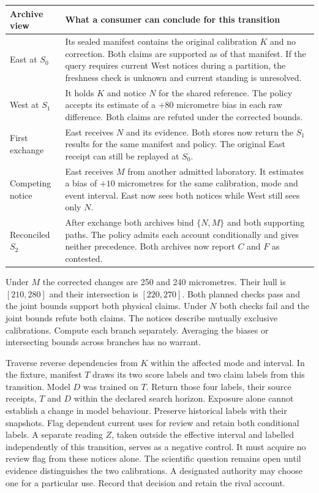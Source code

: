 \documentclass[11pt,a4paper]{article}
\begin{document}
\small
\begin{tabularx}{\linewidth}{@{}L{.22\linewidth}Y@{}}
\toprule
\textbf{Archive view} & \textbf{What a consumer can conclude for this transition} \\ \midrule
East at $S_0$ & Its sealed manifest contains the original calibration $K$ and no correction. Both claims are supported as of that manifest. If the query requires current West notices during a partition, the freshness check is unknown and current standing is unresolved. \\
West at $S_1$ & It holds $K$ and notice $N$ for the shared reference. The policy accepts its estimate of a $+80$ micrometre bias in each raw difference. Both claims are refuted under the corrected bounds. \\
First exchange & East receives $N$ and its evidence. Both stores now return the $S_1$ results for the same manifest and policy. The original East receipt can still be replayed at $S_0$. \\
Competing notice & East receives $M$ from another admitted laboratory. It estimates a bias of $+10$ micrometres for the same calibration, mode and event interval. East now sees both notices while West still sees only $N$. \\
Reconciled $S_2$ & After exchange both archives bind $\{N,M\}$ and both supporting paths. The policy admits each account conditionally and gives neither precedence. Both archives now report $C$ and $F$ as contested. \\
\bottomrule
\end{tabularx}
\normalsize

Under $M$ the corrected changes are 250 and 240 micrometres. Their hull is $[210,280]$ and their intersection is $[220,270]$. Both planned checks pass and the joint bounds support both physical claims. Under $N$ both checks fail and the joint bounds refute both claims. The notices describe mutually exclusive calibrations. Compute each branch separately. Averaging the biases or intersecting bounds across branches has no warrant.

Traverse reverse dependencies from $K$ within the affected mode and interval. In the fixture, manifest $T$ draws its two score labels and two claim labels from this transition. Model $D$ was trained on $T$. Return those four labels, their source receipts, $T$ and $D$ within the declared search horizon. Exposure alone cannot establish a change in model behaviour. Preserve historical labels with their snapshots. Flag dependent current uses for review and retain both conditional labels. A separate reading $Z$, taken outside the effective interval and labelled independently of this transition, serves as a negative control. It must acquire no review flag from these notices alone. The scientific question remains open until evidence distinguishes the two calibrations. A designated authority may choose one for a particular use. Record that decision and retain the rival account.
\end{document}
